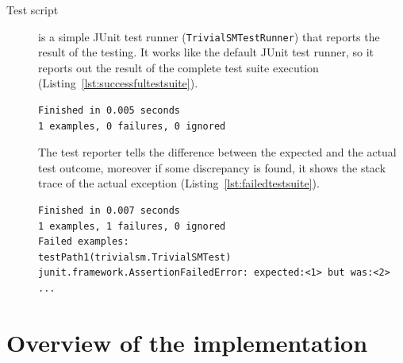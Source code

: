 \begin{description}
	\item[Test script] is a simple JUnit test runner (\texttt{TrivialSMTestRunner}) that reports the result of the testing. It works like the default JUnit test runner, so it reports out the result of the complete test suite execution (Listing~\ref{lst:successfultestsuite}).

\begin{lstlisting}[label={lst:successfultestsuite}, caption=Successful test suite execution output,breaklines=true]
Finished in 0.005 seconds
1 examples, 0 failures, 0 ignored
\end{lstlisting}
	
	The test reporter tells the difference between the expected and the actual test outcome, moreover if some discrepancy is found, it shows the stack trace of the actual exception (Listing~\ref{lst:failedtestsuite}).

\begin{lstlisting}[label={lst:failedtestsuite}, caption=Failed test suite execution output,breaklines=true]
Finished in 0.007 seconds
1 examples, 1 failures, 0 ignored
Failed examples:
testPath1(trivialsm.TrivialSMTest)
junit.framework.AssertionFailedError: expected:<1> but was:<2>
...
\end{lstlisting}
	
\end{description}
	

\newpage

\section{Overview of the implementation}
\label{sec:implementationoverview}

